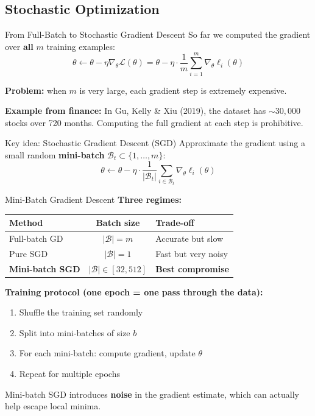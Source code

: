 \documentclass[aspectratio=169]{beamer}
\begin{document}
\subsection{Stochastic Optimization}
%
\begin{frame}{From Full-Batch to Stochastic Gradient Descent}
\small
So far we computed the gradient over \textbf{all} $m$ training examples:
\[
\theta \leftarrow \theta - \eta \nabla_\theta \mathcal{L}(\theta) = \theta - \eta \cdot \frac{1}{m}\sum_{i=1}^m \nabla_\theta \ell_i(\theta)
\]

\textbf{Problem:} when $m$ is very large, each gradient step is extremely expensive.

\medskip
\textbf{Example from finance:} In Gu, Kelly \& Xiu (2019), the dataset has ${\sim}30{,}000$ stocks over 720 months. Computing the full gradient at each step is prohibitive.

\vspace{0.3cm}
\begin{alertblock}{Key idea: Stochastic Gradient Descent (SGD)}
Approximate the gradient using a small random \textbf{mini-batch} $\mathcal{B}_t \subset \{1,\ldots,m\}$:
\[
\theta \leftarrow \theta - \eta \cdot \frac{1}{|\mathcal{B}_t|}\sum_{i \in \mathcal{B}_t} \nabla_\theta \ell_i(\theta)
\]
\end{alertblock}
\end{frame}
%
%
\begin{frame}{Mini-Batch Gradient Descent}
\small
\textbf{Three regimes:}

\medskip
\begin{center}
\renewcommand{\arraystretch}{1.3}
\begin{tabular}{l c l}
\hline
\textbf{Method} & \textbf{Batch size} & \textbf{Trade-off} \\
\hline
Full-batch GD & $|\mathcal{B}| = m$ & Accurate but slow \\
Pure SGD & $|\mathcal{B}| = 1$ & Fast but very noisy \\
\textbf{Mini-batch SGD} & $|\mathcal{B}| \in [32, 512]$ & \textbf{Best compromise} \\
\hline
\end{tabular}
\end{center}

\vspace{0.4cm}
\textbf{Training protocol (one epoch = one pass through the data):}
\begin{enumerate}
    \item Shuffle the training set randomly
    \item Split into mini-batches of size $b$
    \item For each mini-batch: compute gradient, update $\theta$
    \item Repeat for multiple epochs
\end{enumerate}

\medskip
Mini-batch SGD introduces \textbf{noise} in the gradient estimate, which can actually help escape local minima.
\end{frame}
\end{document}
